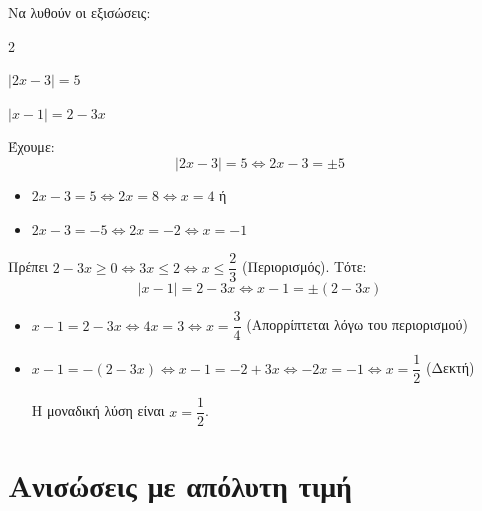 Να λυθούν οι εξισώσεις:
\begin{multicols}{2}
\begin{alist}
\item $|2x - 3| = 5 $
\item $|x - 1| = 2 - 3x$
\end{alist}
\end{multicols}
\lysh\vspace{-5mm}
\begin{alist}
\item Έχουμε:
\[|2x-3|=5\Leftrightarrow 2x-3=\pm5\]
\begin{itemize}
\item $2x-3=5\Leftrightarrow 2x=8\Leftrightarrow x=4$ ή
\item $2x-3=-5\Leftrightarrow 2x=-2\Leftrightarrow x=-1$
\end{itemize}
\item Πρέπει $2 - 3x \geq 0 \Leftrightarrow 3x \leq 2 \Leftrightarrow x \leq \dfrac{2}{3}$ (Περιορισμός).
Τότε:
\[|x-1|=2-3x\Leftrightarrow x-1=\pm(2-3x)\]
\begin{itemize}
\item $x - 1 = 2 - 3x \Leftrightarrow 4x = 3 \Leftrightarrow x = \dfrac{3}{4}$ \quad ({Απορρίπτεται λόγω του περιορισμού})
\item 
$x - 1 = -(2 - 3x) \Leftrightarrow x - 1 = -2 + 3x \Leftrightarrow -2x = -1 \Leftrightarrow x = \dfrac{1}{2}$ \quad ({{Δεκτή}})

Η μοναδική λύση είναι $ x = \dfrac{1}{2} $.
\end{itemize}

\end{alist}
\section{Ανισώσεις με απόλυτη τιμή}

